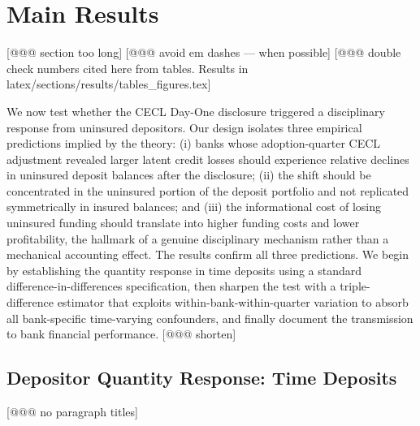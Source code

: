
\section{Main Results}
[@@@ section too long]
[@@@ avoid em dashes --- when possible]
[@@@ double check numbers cited here from tables. Results in latex/sections/results/tables_figures.tex]
\label{sec:results}

We now test whether the CECL Day-One disclosure triggered a disciplinary
response from uninsured depositors.  Our design isolates three empirical
predictions implied by the theory: (i) banks whose adoption-quarter CECL
adjustment revealed larger latent credit losses should experience relative
declines in uninsured deposit balances after the disclosure; (ii) the shift
should be concentrated in the uninsured portion of the deposit portfolio and not
replicated symmetrically in insured balances; and (iii) the informational cost of
losing uninsured funding should translate into higher funding costs and lower
profitability, the hallmark of a genuine disciplinary mechanism rather than a
mechanical accounting effect.  The results confirm all three predictions.  We
begin by establishing the quantity response in time deposits using a standard
difference-in-differences specification, then sharpen the test with a
triple-difference estimator that exploits within-bank-within-quarter variation to
absorb all bank-specific time-varying confounders, and finally document the
transmission to bank financial performance. [@@@ shorten]

\subsection{Depositor Quantity Response: Time Deposits}
\label{sec:results:time_deposits}
[@@@ no paragraph titles]
